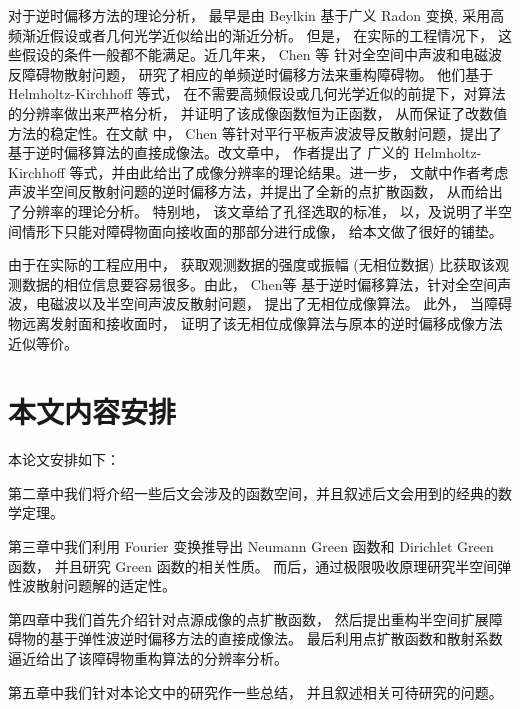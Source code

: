 对于逆时偏移方法的理论分析， 最早是由 Beylkin \cite{beylkin1984inversion,beylkin1985imaging,beylkin1990linearized} 基于广义 Radon 变换, 采用高
频渐近假设或者几何光学近似给出的渐近分析。 但是， 在实际的工程情况下， 这些假设的条件一般都不能满足。近几年来， Chen 等\cite{chen2013reverse_acou,chen2013reverse_elec,thesis_guanghui} 针对全空间中声波和电磁波反障碍物散射问题， 研究了相应的单频逆时偏移方法来重构障碍物。 他们基于  Helmholtz-Kirchhoff 等式， 在不需要高频假设或几何光学近似的前提下，对算法的分辨率做出来严格分析， 并证明了该成像函数恒为正函数， 从而保证了改数值方法的稳定性。在文献 \cite{chen2015reverse_planar} 中， Chen 等针对平行平板声波波导反散射问题，提出了基于逆时偏移算法的直接成像法。改文章中， 作者提出了 广义的 Helmholtz-Kirchhoff 等式，并由此给出了成像分辨率的理论结果。进一步， 文献\cite{RTMhalf_aco}中作者考虑声波半空间反散射问题的逆时偏移方法，并提出了全新的点扩散函数， 从而给出了分辨率的理论分析。 特别地， 该文章给了孔径选取的标准， 以，及说明了半空间情形下只能对障碍物面向接收面的那部分进行成像， 给本文做了很好的铺垫。

由于在实际的工程应用中， 获取观测数据的强度或振幅 (无相位数据) 比获取该观测数据的相位信息要容易很多。由此， Chen等 \cite{chen2017phaseless,chen2016direct,chen2017direct,thesis_shaofeng} 基于逆时偏移算法，针对全空间声波，电磁波以及半空间声波反散射问题， 提出了无相位成像算法。 此外， 当障碍物远离发射面和接收面时， 证明了该无相位成像算法与原本的逆时偏移成像方法近似等价。




\section{本文内容安排}

本论文安排如下：

第二章中我们将介绍一些后文会涉及的函数空间，并且叙述后文会用到的经典的数学定理。

第三章中我们利用 Fourier 变换推导出 Neumann Green 函数和 Dirichlet Green 函数， 并且研究 Green 函数的相关性质。 而后，通过极限吸收原理研究半空间弹性波散射问题解的适定性。

第四章中我们首先介绍针对点源成像的点扩散函数， 然后提出重构半空间扩展障碍物的基于弹性波逆时偏移方法的直接成像法。 最后利用点扩散函数和散射系数逼近给出了该障碍物重构算法的分辨率分析。

第五章中我们针对本论文中的研究作一些总结， 并且叙述相关可待研究的问题。

